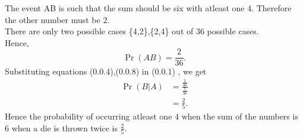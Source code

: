 \documentclass[journal,12pt,twocolumn]{IEEEtran}
\begin{document}
The event AB is such that the sum should be six with atleast one 4.
Therefore the other number must be 2.\\
There are only two possible cases \{4,2\},\{2,4\} out of 36 possible cases.\\
Hence,\\
\begin{equation}
    \Pr{(AB)}=\frac{2}{36}.    
\end{equation}
Substituting equations (0.0.4),(0.0.8) in (0.0.1) , we get\\
\begin{equation}
\begin{split}
\Pr(B|A)&=\frac{\frac{2}{36}}{\frac{5}{36}}\\
&=\frac{2}{5}.
\end{split}
\end{equation}
Hence the probability of occurring atleast one 4 when the sum of the numbers is 6 when a die is thrown twice is $\frac{2}{5}$. 
\end{document}
